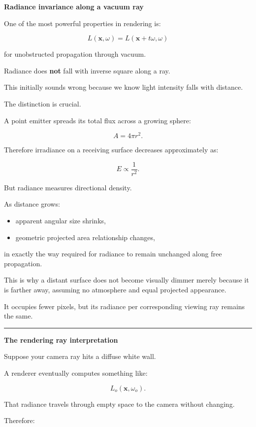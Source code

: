 \textbf{Radiance invariance along a vacuum ray}

One of the most powerful properties in rendering is:

\[
\boxed{
L(\mathbf x,\omega)
=
L(\mathbf x+t\omega,\omega)
}
\]

for unobstructed propagation through vacuum.

Radiance does \textbf{not} fall with inverse square along a ray.

This initially sounds wrong because we know light intensity falls with distance.

The distinction is crucial.

A point emitter spreads its total flux across a growing sphere:

\[
A=4\pi r^2.
\]

Therefore irradiance on a receiving surface decreases approximately as:

\[
E\propto\frac1{r^2}.
\]

But radiance measures directional density.

As distance grows:

\begin{itemize}
\tightlist
\item
  apparent angular size shrinks,
\item
  geometric projected area relationship changes,
\end{itemize}

in exactly the way required for radiance to remain unchanged along free propagation.

This is why a distant surface does not become visually dimmer merely because it is farther away, assuming no atmosphere and equal projected appearance.

It occupies fewer pixels, but its radiance per corresponding viewing ray remains the same.

\begin{center}\rule{0.5\linewidth}{0.5pt}\end{center}

\textbf{The rendering ray interpretation}

Suppose your camera ray hits a diffuse white wall.

A renderer eventually computes something like:

\[
L_o(\mathbf x,\omega_o).
\]

That radiance travels through empty space to the camera without changing.

Therefore:

